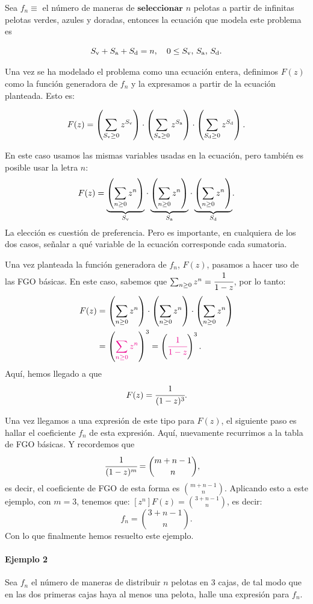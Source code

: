 Sea $f_n\equiv$ el número de maneras de $\textbf{seleccionar}$ $n$ pelotas a partir de infinitas pelotas verdes, azules y doradas, entonces la ecuación que modela este problema es

$$S_{\rm v}+S_{\rm a} + S_{\rm d}=n,\quad 0\leq S_{\rm v},\,S_{\rm a},\,S_{\rm d}.$$

Una vez se ha modelado el problema como una ecuación entera, definimos $F(z)$ como la función generadora de $f_n$ y la expresamos a partir de la ecuación planteada. Esto es:

$$F(z)=\left(\sum_{S_{\rm v}\geq 0} {z^{S_{\rm v}}}\right)\cdot\left(\sum_{S_{\rm a}\geq 0} {z^{S_{\rm a}}}\right)\cdot\left(\sum_{S_{\rm d}\geq 0} {z^{S_{\rm d}}}\right).$$

En este caso usamos las mismas variables usadas en la ecuación, pero también es posible usar la letra $n$:
$$F(z)=\underset{S_{\rm v}}{\underbrace{\left(\sum_{n\geq 0} {z^{n}}\right)}}\cdot\underset{S_{\rm a}}{\underbrace{\left(\sum_{n\geq 0} {z^{n}}\right)}}\cdot\underset{S_{\rm d}}{\underbrace{\left(\sum_{n\geq 0} {z^{n}}\right)}}.$$
La elección es cuestión de preferencia. Pero es importante, en cualquiera de los dos casos, señalar a qué variable de la ecuación corresponde cada sumatoria.

Una vez planteada la función generadora de $f_n$, $F(z)$, pasamos a hacer uso de las FGO básicas. En este caso, sabemos que
$\sum_{n\geq0}z^n=\cfrac{1}{1-z}$, por lo tanto:
\begin{align*}
F(z)&=\left(\sum_{n\geq 0} {z^{n}}\right)\cdot
\left(\sum_{n\geq 0} {z^{n}}\right)\cdot\left(\sum_{n\geq 0} {z^{n}}\right)\\
&=\left({\color{magenta}\sum_{n\geq 0} {z^{n}}}\right)^3
=\left({\color{magenta}\cfrac{1}{1-z}}\right)^3.
\end{align*}
Aquí, hemos llegado a que
$$F(z)=\cfrac{1}{(1-z)^3}.$$

Una vez llegamos a una expresión de este tipo para $F(z)$, el siguiente paso es hallar el coeficiente $f_n$ de esta expresión. Aquí, nuevamente recurrimos a la tabla de FGO básicas.
Y recordemos que
\begin{align*}
[z^n]\cfrac{1}{(1-z)^m}&=\binom{m+n-1}{n},
\end{align*}
es decir, el coeficiente de FGO de esta forma es $\binom{m+n-1}{n}$. Aplicando esto a este ejemplo, con $m=3$, tenemos que:
$[z^n]F(z)=\binom{3+n-1}{n}$, es decir:
$$f_n=\binom{3+n-1}{n}.$$
Con lo que finalmente hemos resuelto este ejemplo.

\paragraph{Ejemplo 2} Sea $f_n$ el número de maneras de distribuir $n$ pelotas en 3 cajas, de tal modo que en las dos primeras cajas haya al menos una pelota, halle una expresión para $f_n$. 

